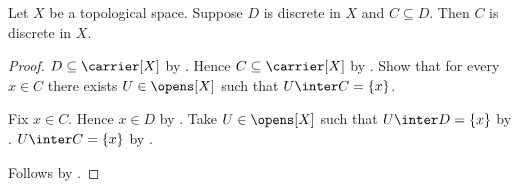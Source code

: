 \begin{theorem}\label{discrete_in_subset}
    Let $X$ be a topological space.
    Suppose $D$ is discrete in $X$ and $C\subseteq D$.
    Then $C$ is discrete in $X$.
\end{theorem}
\begin{proof}
    $D\subseteq\carrier[X]$ by .
    Hence $C\subseteq\carrier[X]$ by .
    Show that for every $x\in C$ there exists $U\in\opens[X]$ such that
        $U\inter C=\{x\}$.
    \begin{subproof}
        Fix $x\in C$.
        Hence $x\in D$ by .
        Take $U\in\opens[X]$ such that $U\inter D=\{x\}$
            by .
        $U\inter C=\{x\}$
            by .
    \end{subproof}
    Follows by .
\end{proof}
